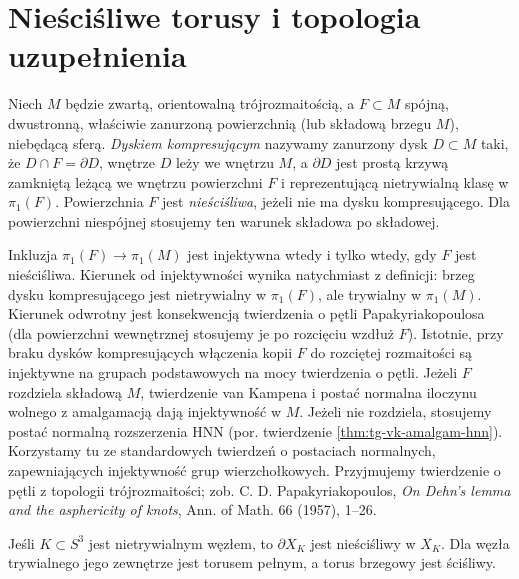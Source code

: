 \section{Nieściśliwe torusy i topologia uzupełnienia}
\label{sec:kt-torus-jsj}

\begin{definicja}
Niech $M$ będzie zwartą, orientowalną trójrozmaitością,
a $F\subset M$ spójną, dwustronną, właściwie zanurzoną
powierzchnią (lub składową brzegu $M$), niebędącą sferą.
\emph{Dyskiem kompresującym} nazywamy zanurzony dysk
$D\subset M$ taki, że $D\cap F=\partial D$, wnętrze
$D$ leży we wnętrzu $M$, a $\partial D$ jest prostą
krzywą zamkniętą leżącą we wnętrzu powierzchni $F$ i reprezentującą
nietrywialną klasę w $\pi_1(F)$. Powierzchnia $F$ jest
\emph{nieściśliwa}, jeżeli nie ma dysku kompresującego.
Dla powierzchni niespójnej stosujemy ten warunek
składowa po składowej.
\end{definicja}

\begin{uwaga}
Inkluzja $\pi_1(F)\to\pi_1(M)$ jest injektywna wtedy
i tylko wtedy, gdy $F$ jest nieściśliwa. Kierunek
od injektywności wynika natychmiast z definicji:
brzeg dysku kompresującego jest nietrywialny w
$\pi_1(F)$, ale trywialny w $\pi_1(M)$. Kierunek
odwrotny jest konsekwencją twierdzenia o pętli
Papakyriakopoulosa (dla powierzchni wewnętrznej
stosujemy je po rozcięciu wzdłuż $F$). Istotnie,
przy braku dysków kompresujących włączenia kopii $F$
do rozciętej rozmaitości są injektywne na grupach
podstawowych na mocy twierdzenia o pętli. Jeżeli $F$
rozdziela składową $M$, twierdzenie van Kampena
i postać normalna iloczynu wolnego z amalgamacją
dają injektywność w $M$. Jeżeli nie rozdziela,
stosujemy postać normalną rozszerzenia HNN
(por. twierdzenie \ref{thm:tg-vk-amalgam-hnn}).
Korzystamy tu ze standardowych twierdzeń o postaciach
normalnych, zapewniających injektywność grup
wierzchołkowych. Przyjmujemy twierdzenie o pętli z
topologii trójrozmaitości; zob. C. D. Papakyriakopoulos,
\emph{On Dehn's lemma and the asphericity of knots},
Ann. of Math. 66 (1957), 1--26.
\end{uwaga}

\begin{stwierdzenie}
\label{prop:kt-boundary-incompressible}
Jeśli $K\subset S^3$ jest nietrywialnym węzłem, to
$\partial X_K$ jest nieściśliwy w $X_K$.
Dla węzła trywialnego jego zewnętrze jest torusem pełnym,
a torus brzegowy jest ściśliwy.
\end{stwierdzenie}

